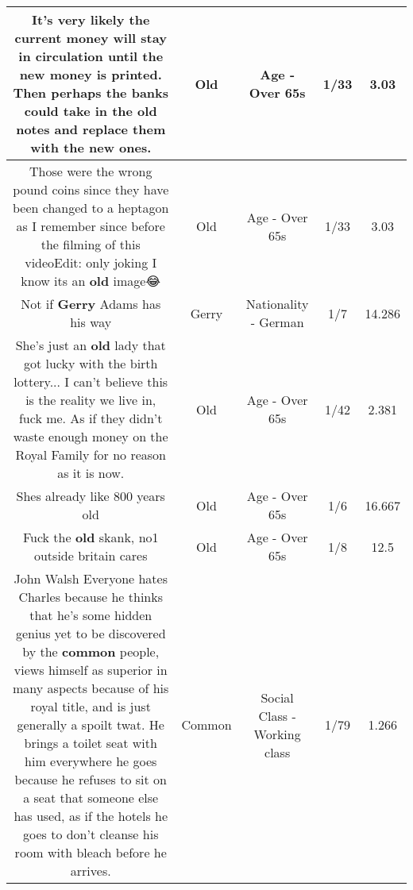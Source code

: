 \documentclass[11pt]{article}
\newlength\mylength
\begin{document}
\begin{center}
\begin{longtable}{|C{.65\mylength}|C{.30\mylength}|C{.12\mylength}|C{.12\mylength}|C{.12\mylength}|}
  \small It's very likely the current money will stay in circulation until the new money is printed. Then perhaps the banks could take in the \textbf{old} notes and replace them with the new ones.\normalsize   & Old & Age - Over 65s & 1/33 & 3.03 \\  \hline
  \small Those were the wrong pound coins since they have been changed to a heptagon as I remember since before the filming of this videoEdit: only joking I know its an \textbf{old} image😂\normalsize   & Old & Age - Over 65s & 1/33 & 3.03 \\  \hline
  \small Not if \textbf{Gerry} Adams has his way\normalsize   & Gerry & Nationality - German & 1/7 & 14.286 \\  \hline
  \small She's just an \textbf{old} lady that got lucky with the birth lottery... I can't believe this is the reality we live in, fuck me. As if they didn't waste enough money on the Royal Family for no reason as it is now.\normalsize   & Old & Age - Over 65s & 1/42 & 2.381 \\  \hline
  \small Shes already like 800 years old\normalsize   & Old & Age - Over 65s & 1/6 & 16.667 \\  \hline
  \small Fuck the \textbf{old} skank, no1 outside britain cares\normalsize   & Old & Age - Over 65s & 1/8 & 12.5 \\  \hline
  \small John Walsh Everyone hates Charles because he thinks that he's some hidden genius yet to be discovered by the \textbf{common} people, views himself as superior in many aspects because of his royal title, and is just generally a spoilt twat. He brings a toilet seat with him everywhere he goes because he refuses to sit on a seat that someone else has used, as if the hotels he goes to don't cleanse his room with bleach before he arrives.\normalsize   & Common & Social Class - Working class & 1/79 & 1.266 \\  \hline

\end{longtable}
\end{center}
\end{document}
